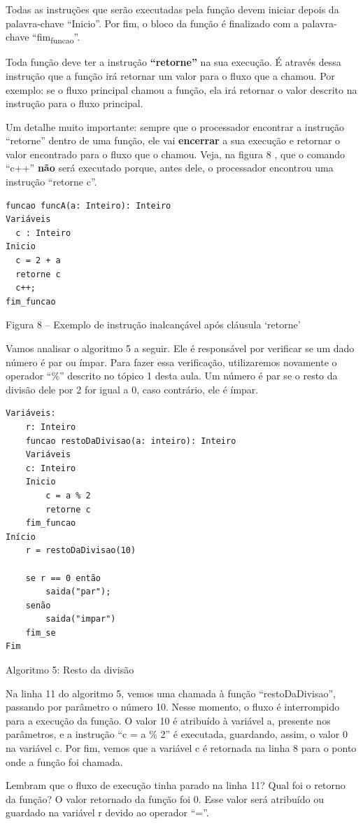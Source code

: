 \documentclass[11pt]{article}
\begin{document}
Todas as instruções que serão executadas pela função devem iniciar depois da palavra-chave “Inicio”. Por fim, o bloco da função é finalizado com a palavra-chave “fim\textsubscript{funcao}”.

Toda função deve ter a instrução \textbf{“retorne”} na sua execução. É através dessa instrução que a função irá retornar um valor para o fluxo que a chamou. Por exemplo: se o fluxo principal chamou a função, ela irá retornar o valor descrito na instrução para o fluxo principal.

Um detalhe muito importante: sempre que o processador encontrar a instrução “retorne” dentro de uma função, ele vai \textbf{encerrar} a sua execução e retornar o valor encontrado para o fluxo que o chamou. Veja, na figura 8 , que o comando “c++” \textbf{não} será executado porque, antes dele, o processador encontrou uma instrução “retorne c”.

\begin{verbatim}
funcao funcA(a: Inteiro): Inteiro
Variáveis
  c : Inteiro
Inicio
  c = 2 + a
  retorne c
  c++;
fim_funcao
\end{verbatim}
Figura 8 – Exemplo de instrução inalcançável após cláusula ‘retorne’

Vamos analisar o algoritmo 5 a seguir. Ele é responsável por verificar se um dado número é par ou ímpar. Para fazer essa verificação, utilizaremos novamente o operador “\%” descrito no tópico 1 desta aula. Um número é par se o resto da divisão dele por 2 for igual a 0, caso contrário, ele é ímpar.

\begin{verbatim}
Variáveis:
    r: Inteiro
    funcao restoDaDivisao(a: inteiro): Inteiro
    Variáveis
    c: Inteiro
    Inicio
        c = a % 2
        retorne c
    fim_funcao
Início
    r = restoDaDivisao(10)

    se r == 0 então
        saida("par");
    senão
        saida("impar")
    fim_se
Fim
\end{verbatim}
Algoritmo 5: Resto da divisão

Na linha 11 do algoritmo 5, vemos uma chamada à função “restoDaDivisao”, passando por parâmetro o número 10. Nesse momento, o fluxo é interrompido para a execução da função. O valor 10 é atribuído à variável a, presente nos parâmetros, e a instrução “c = a \% 2” é executada, guardando, assim, o valor 0 na variável c. Por fim, vemos que a variável c é retornada na linha 8 para o ponto onde a função foi chamada.

Lembram que o fluxo de execução tinha parado na linha 11? Qual foi o retorno da função? O valor retornado da função foi 0. Esse valor será atribuído ou guardado na variável r devido ao operador “=”.
\end{document}
